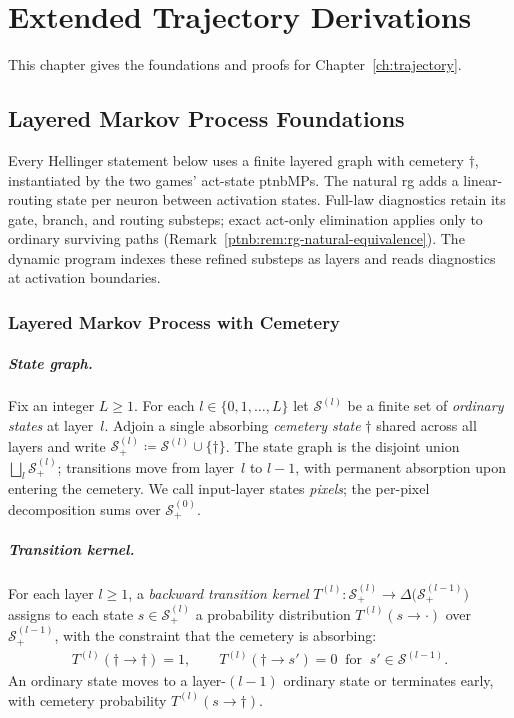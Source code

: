 \chapter{Extended Trajectory Derivations}\label{app:supp_trajectory}

This chapter gives the foundations and proofs for Chapter~\ref{ch:trajectory}.

\section{Layered Markov Process Foundations}\label{ptnb:sec:lmp-foundations}\label{subsec:trajectory_measures}

Every Hellinger statement below uses a finite layered graph with cemetery $\dagger$,
instantiated by the two games' act-state \acp{ptnbMP}. The natural \ac{rg} adds a
linear-routing state per neuron between activation states. Full-law diagnostics
retain its gate, branch, and routing substeps; exact act-only elimination applies
only to ordinary surviving paths (Remark~\ref{ptnb:rem:rg-natural-equivalence}).
The dynamic program indexes these refined substeps as layers and reads diagnostics
at activation boundaries.

\subsection{Layered Markov Process with Cemetery}\label{ptnb:sec:lmp}

\paragraph{State graph.}
Fix an integer $L \geq 1$.  For each $l \in \{0, 1, \ldots, L\}$ let $\mathcal{S}^{(l)}$ be a
finite set of \emph{ordinary states} at layer~$l$.  Adjoin a single absorbing \emph{cemetery state}
$\dagger$ shared across all layers and write $\mathcal{S}^{(l)}_+ \coloneqq \mathcal{S}^{(l)} \cup
    \{\dagger\}$.
The state graph is the disjoint union $\bigsqcup_l \mathcal{S}^{(l)}_+$; transitions
move from layer~$l$ to $l{-}1$, with permanent absorption upon entering the cemetery.
We call input-layer states \emph{pixels}; the per-pixel decomposition sums over
$\mathcal{S}^{(0)}_+$.

\paragraph{Transition kernel.}
For each layer $l \geq 1$, a \emph{backward transition kernel} $T^{(l)} : \mathcal{S}^{(l)}_+ \to
    \Delta\bigl(\mathcal{S}^{(l-1)}_+\bigr)$ assigns to each state $s \in \mathcal{S}^{(l)}_+$ a
probability distribution $T^{(l)}(s \to \cdot)$ over $\mathcal{S}^{(l-1)}_+$, with the constraint
that the cemetery is absorbing:
\begin{align}\label{ptnb:eq:cemetery-absorbing}
    T^{(l)}(\dagger \to \dagger) = 1, \qquad T^{(l)}(\dagger \to s') = 0 \;\;\text{for}\;\; s' \in
    \mathcal{S}^{(l-1)}.
\end{align}
An ordinary state moves to a layer-$(l{-}1)$ ordinary state or terminates early,
with cemetery probability $T^{(l)}(s \to \dagger)$.

